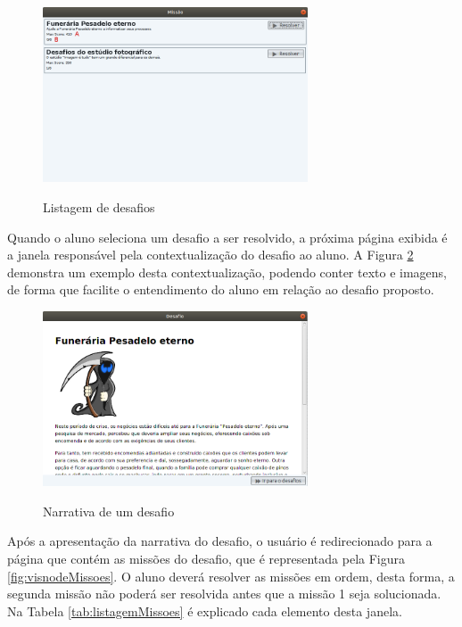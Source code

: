 \documentclass[
	12pt,				%
	oneside,			%
	a4paper,			%
	english,			%
	french,				%
	spanish,			%
	brazil,				%
	]{abntex2}
\begin{document}
\begin{figure}[H]
\centering
\caption{Listagem de desafios}
\includegraphics[width=0.7\textwidth]{imagens/visnode_desafios.png}
\sourceAuthor
\label{fig:visnodeDesafios}
\end{figure}



Quando o aluno seleciona um desafio a ser resolvido, a próxima página exibida é a janela responsável pela contextualização do desafio ao aluno. A Figura \ref{fig:visnodeDesafiosNarrativa} demonstra um exemplo desta contextualização, podendo conter texto e imagens, de forma que facilite o entendimento do aluno em relação ao desafio proposto.

\begin{figure}[H]
\centering
\caption{Narrativa de um desafio}
\includegraphics[width=0.7\textwidth]{imagens/visnode_desafios_narrativa.png}
\sourceAuthor
\label{fig:visnodeDesafiosNarrativa}
\end{figure}

Após a apresentação da narrativa do desafio, o usuário é redirecionado para a página que contém as missões do desafio, que é representada pela Figura \ref{fig:visnodeMissoes}. O aluno deverá resolver as missões em ordem, desta forma, a segunda missão não poderá ser resolvida antes que a missão 1 seja solucionada. Na Tabela \ref{tab:listagemMissoes} é explicado cada elemento desta janela.
\end{document}
